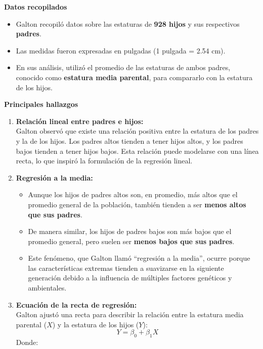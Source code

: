 \documentclass[
  letterpaper,
  DIV=11,
  numbers=noendperiod]{scrreprt}
\providecommand{\tightlist}{%
  \setlength{\itemsep}{0pt}\setlength{\parskip}{0pt}}
\begin{document}
\begin{tcolorbox}[enhanced jigsaw, breakable, toprule=.15mm, bottomtitle=1mm, coltitle=black, colbacktitle=quarto-callout-tip-color!10!white, titlerule=0mm, opacitybacktitle=0.6, bottomrule=.15mm, toptitle=1mm, title=\textcolor{quarto-callout-tip-color}{\faLightbulb}\hspace{0.5em}{Estudios de Galton sobre estatura}, arc=.35mm, rightrule=.15mm, opacityback=0, colframe=quarto-callout-tip-color-frame, leftrule=.75mm, left=2mm, colback=white]

\textbf{Datos recopilados}

\begin{itemize}
\tightlist
\item
  Galton recopiló datos sobre las estaturas de \textbf{928 hijos} y sus
  respectivos \textbf{padres}.
\item
  Las medidas fueron expresadas en pulgadas (1 pulgada = 2.54 cm).\\
\item
  En sus análisis, utilizó el promedio de las estaturas de ambos padres,
  conocido como \textbf{estatura media parental}, para compararlo con la
  estatura de los hijos.
\end{itemize}

\textbf{Principales hallazgos}

\begin{enumerate}
\def\labelenumi{\arabic{enumi}.}
\item
  \textbf{Relación lineal entre padres e hijos:}\\
  Galton observó que existe una relación positiva entre la estatura de
  los padres y la de los hijos. Los padres altos tienden a tener hijos
  altos, y los padres bajos tienden a tener hijos bajos. Esta relación
  puede modelarse con una línea recta, lo que inspiró la formulación de
  la regresión lineal.
\item
  \textbf{Regresión a la media:}

  \begin{itemize}
  \tightlist
  \item
    Aunque los hijos de padres altos son, en promedio, más altos que el
    promedio general de la población, también tienden a ser
    \textbf{menos altos que sus padres}.\\
  \item
    De manera similar, los hijos de padres bajos son más bajos que el
    promedio general, pero suelen ser \textbf{menos bajos que sus
    padres}.\\
  \item
    Este fenómeno, que Galton llamó ``regresión a la media'', ocurre
    porque las características extremas tienden a suavizarse en la
    siguiente generación debido a la influencia de múltiples factores
    genéticos y ambientales.
  \end{itemize}
\item
  \textbf{Ecuación de la recta de regresión:}\\
  Galton ajustó una recta para describir la relación entre la estatura
  media parental (\(X\)) y la estatura de los hijos (\(Y\)): \[
  Y = \beta_0 + \beta_1 X
  \] Donde:


\end{enumerate}
\end{tcolorbox}
\end{document}
